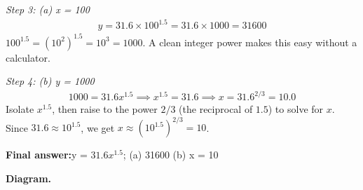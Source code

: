 \documentclass[11pt]{article}
\begin{document}
\textit{Step 3: (a) x = 100}
\[\begin{gathered}
y = 31.6 \times 100^{1.5} = 31.6 \times 1000 = 31600
\end{gathered}\]
\( 100^{1.5} = (10^{2})^{1.5} = 10^{3} = 1000 \). A clean integer power makes this easy without a calculator.

\textit{Step 4: (b) y = 1000}
\[\begin{gathered}
1000 = 31.6x^{1.5} \implies x^{1.5} = 31.6 \implies x = 31.6^{2/3} = 10.0
\end{gathered}\]
Isolate \( x^{1.5} \), then raise to the power \( 2/3 \) (the reciprocal of \( 1.5 \)) to solve for \( x \). Since \( 31.6 \approx 10^{1.5} \), we get \( x \approx (10^{1.5})^{2/3} = 10 \).

\begin{answerbox}
\textbf{Final answer:}\quad y = $31.6x^{1.5}$; (a) 31600 (b) x = 10
\end{answerbox}
\textbf{Diagram.}
\end{document}
